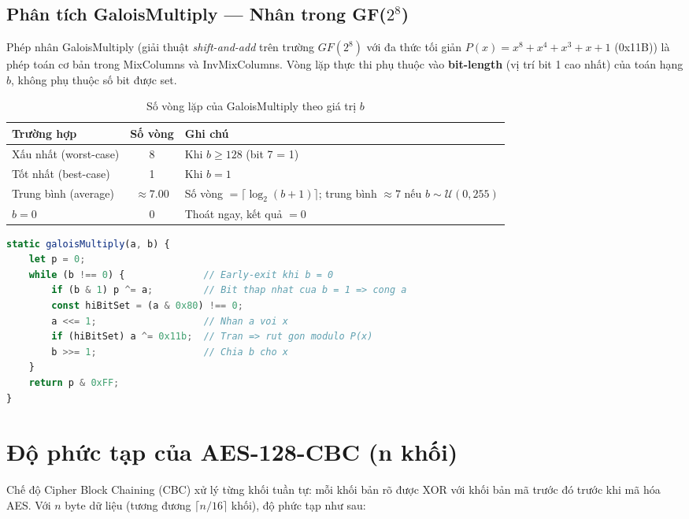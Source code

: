\subsection{Phân tích GaloisMultiply --- Nhân trong GF($2^8$)}

Phép nhân GaloisMultiply (giải thuật \textit{shift-and-add} trên trường $GF(2^8)$ với đa thức tối giản $P(x)=x^8+x^4+x^3+x+1$ (0x11B)) là phép toán cơ bản trong MixColumns và InvMixColumns. Vòng lặp thực thi phụ thuộc vào \textbf{bit-length} (vị trí bit 1 cao nhất) của toán hạng $b$, không phụ thuộc số bit được set.

\begin{table}[htbp]
\centering
\caption{Số vòng lặp của GaloisMultiply theo giá trị $b$}
\label{tab:galois}
\begin{tabular}{@{}p{4.5cm}cp{6cm}@{}}
\toprule
\textbf{Trường hợp} & \textbf{Số vòng} & \textbf{Ghi chú} \\
\midrule
Xấu nhất (worst-case) & 8   & Khi $b \ge 128$ (bit 7 = 1) \\
Tốt nhất (best-case)  & 1   & Khi $b = 1$ \\
Trung bình (average)  & $\approx 7.00$ & Số vòng $= \lceil\log_2(b+1)\rceil$; trung bình $\approx 7$ nếu $b \sim \mathcal{U}(0,255)$ \\
$b = 0$               & 0   & Thoát ngay, kết quả $=0$ \\
\bottomrule
\end{tabular}
\end{table}

\begin{lstlisting}[language=JavaScript, caption={Hàm galoisMultiply --- Nhân trong GF($2^8$)}, label=lst:galois]
static galoisMultiply(a, b) {
    let p = 0;
    while (b !== 0) {              // Early-exit khi b = 0
        if (b & 1) p ^= a;         // Bit thap nhat cua b = 1 => cong a
        const hiBitSet = (a & 0x80) !== 0;
        a <<= 1;                   // Nhan a voi x
        if (hiBitSet) a ^= 0x11b;  // Tran => rut gon modulo P(x)
        b >>= 1;                   // Chia b cho x
    }
    return p & 0xFF;
}
\end{lstlisting}

\section{Độ phức tạp của AES-128-CBC (n khối)}
\label{sec:cplx-cbc}

Chế độ Cipher Block Chaining (CBC) xử lý từng khối tuần tự: mỗi khối bản rõ được XOR với khối bản mã trước đó trước khi mã hóa AES. Với $n$ byte dữ liệu (tương đương $\lceil n/16 \rceil$ khối), độ phức tạp như sau:

